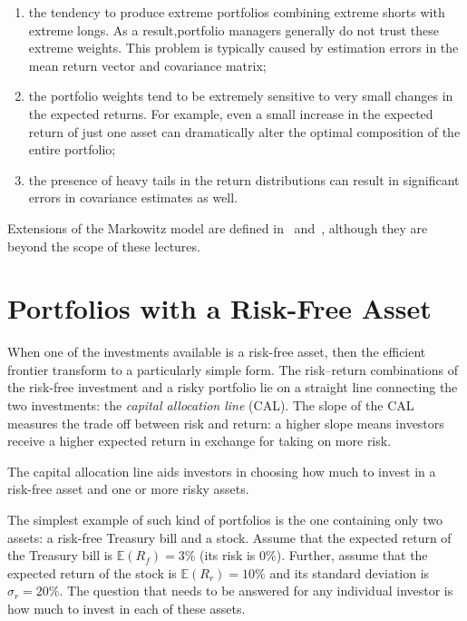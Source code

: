 \begin{enumerate}
\tightlist
\item the tendency to produce extreme portfolios combining extreme shorts with extreme longs. As a result,portfolio managers generally do not trust these extreme weights. This problem is typically caused by
estimation errors in the mean return vector and covariance matrix;
\item the portfolio weights tend to be extremely sensitive to very small changes in the expected returns. For example, even a small increase in the expected return of just one asset can dramatically alter the optimal composition of the entire portfolio;
\item the presence of heavy tails in the return distributions can result in significant errors in covariance estimates as well.
\end{enumerate}

Extensions of the Markowitz model are defined in~\cite{bib:post_modern_theory} and~\cite{bib:black_litterman}, although they are beyond the scope of these lectures. 
    
\section{Portfolios with a Risk-Free Asset}
\label{portfolios-with-a-risk-free-asset}

When one of the investments available is a risk-free asset, then the efficient frontier transform to a particularly simple form. The risk–return combinations of the risk-free investment and a risky portfolio lie on a straight line connecting the two investments: the \emph{capital allocation line} (CAL). The slope of the CAL measures the trade off between risk and return: a higher slope means investors receive a higher expected return in exchange for taking on more risk.

The capital allocation line aids investors in choosing how much to invest in a risk-free asset and one or more risky assets.

The simplest example of such kind of portfolios is the one containing only two assets: a risk-free Treasury bill and a stock. Assume that the expected return of the Treasury bill is \(\mathbb{E}(R_f)=3\%\) (its risk is 0\%). Further, assume that the expected return of the stock is \(\mathbb{E}(R_r)=10\%\) and its standard deviation is \(\sigma_r=20\%\). The question that needs to be answered for any individual investor is how much to invest in each of these assets.

